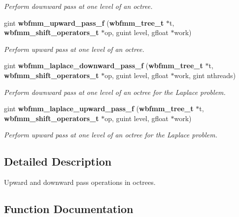 \begin{DoxyCompactItemize}
\begin{DoxyCompactList}\small\item\em Perform downward pass at one level of an octree. \end{DoxyCompactList}\item 
gint {\bf wbfmm\+\_\+upward\+\_\+pass\+\_\+f} ({\bf wbfmm\+\_\+tree\+\_\+t} $\ast$t, {\bf wbfmm\+\_\+shift\+\_\+operators\+\_\+t} $\ast$op, guint level, gfloat $\ast$work)
\begin{DoxyCompactList}\small\item\em Perform upward pass at one level of an octree. \end{DoxyCompactList}\item 
gint {\bf wbfmm\+\_\+laplace\+\_\+downward\+\_\+pass\+\_\+f} ({\bf wbfmm\+\_\+tree\+\_\+t} $\ast$t, {\bf wbfmm\+\_\+shift\+\_\+operators\+\_\+t} $\ast$op, guint level, gfloat $\ast$work, gint nthreads)
\begin{DoxyCompactList}\small\item\em Perform downward pass at one level of an octree for the Laplace problem. \end{DoxyCompactList}\item 
gint {\bf wbfmm\+\_\+laplace\+\_\+upward\+\_\+pass\+\_\+f} ({\bf wbfmm\+\_\+tree\+\_\+t} $\ast$t, {\bf wbfmm\+\_\+shift\+\_\+operators\+\_\+t} $\ast$op, guint level, gfloat $\ast$work)
\begin{DoxyCompactList}\small\item\em Perform upward pass at one level of an octree for the Laplace problem. \end{DoxyCompactList}\end{DoxyCompactItemize}


\subsection{Detailed Description}
Upward and downward pass operations in octrees. 



\subsection{Function Documentation}
